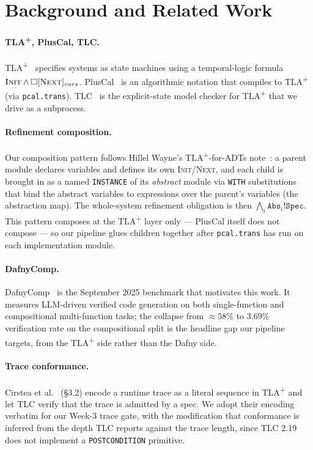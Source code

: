 \documentclass[11pt]{article}
\newcommand{\TLA}{TLA\textsuperscript{+}}
\newcommand{\nxt}{\textsc{Next}}
\newcommand{\initp}{\textsc{Init}}
\begin{document}
\section{Background and Related Work}\label{sec:background}

\paragraph{\TLA{}, PlusCal, TLC.} \TLA{}~\cite{lamport2002specifying}
specifies systems as state machines using a temporal-logic formula
$\initp \wedge \Box [\nxt]_{vars}$. PlusCal~\cite{lamport2009pluscal} is an
algorithmic notation that compiles to \TLA{} (via \texttt{pcal.trans}). TLC~\cite{yu1999tlc}
is the explicit-state model checker for \TLA{} that we drive as a subprocess.

\paragraph{Refinement composition.} Our composition pattern follows Hillel
Wayne's \TLA{}-for-ADTs note~\cite{hillelwayne-tla-adt}: a parent module
declares variables and defines its own \initp{}/\nxt{}, and each child is
brought in as a named \texttt{INSTANCE} of its \emph{abstract} module via
\texttt{WITH} substitutions that bind the abstract variables to expressions
over the parent's variables (the abstraction map). The whole-system
refinement obligation is then $\bigwedge_i \texttt{Abs}_i!\texttt{Spec}$.
This pattern composes at the \TLA{} layer only --- PlusCal itself does not
compose --- so our pipeline glues children together after
\texttt{pcal.trans} has run on each implementation module.

\paragraph{DafnyComp.} DafnyComp~\cite{dafnycomp2025} is the September 2025
benchmark that motivates this work. It measures LLM-driven verified code
generation on both single-function and compositional multi-function tasks; the
collapse from $\approx 58\%$ to $3.69\%$ verification rate on the
compositional split is the headline gap our pipeline targets, from the \TLA{}
side rather than the Dafny side.

\paragraph{Trace conformance.} Cirstea et al.~\cite{cirstea2024} (\S 3.2)
encode a runtime trace as a literal sequence in \TLA{} and let TLC verify
that the trace is admitted by a spec. We adopt their encoding verbatim for
our Week-3 trace gate, with the modification that conformance is inferred from
the depth TLC reports against the trace length, since TLC 2.19 does not
implement a \texttt{POSTCONDITION} primitive.
\end{document}
